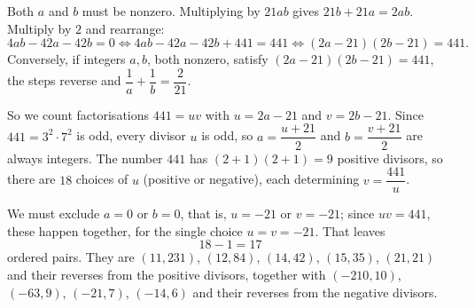 Both $a$ and $b$ must be nonzero. Multiplying by $21ab$ gives $21b+21a=2ab$. Multiply by $2$ and rearrange:
\[4ab-42a-42b=0\iff 4ab-42a-42b+441=441\iff (2a-21)(2b-21)=441 .\]
Conversely, if integers $a,b$, both nonzero, satisfy $(2a-21)(2b-21)=441$, the steps reverse and $\dfrac{1}{a}+\dfrac{1}{b}=\dfrac{2}{21}$.

So we count factorisations $441=uv$ with $u=2a-21$ and $v=2b-21$. Since $441=3^2\cdot7^2$ is odd, every divisor $u$ is odd, so $a=\dfrac{u+21}{2}$ and $b=\dfrac{v+21}{2}$ are always integers. The number $441$ has $(2+1)(2+1)=9$ positive divisors, so there are $18$ choices of $u$ (positive or negative), each determining $v=\dfrac{441}{u}$.

We must exclude $a=0$ or $b=0$, that is, $u=-21$ or $v=-21$; since $uv=441$, these happen together, for the single choice $u=v=-21$. That leaves
\[18-1=\boxed{17}\]
ordered pairs. They are $(11,231)$, $(12,84)$, $(14,42)$, $(15,35)$, $(21,21)$ and their reverses from the positive divisors, together with $(-210,10)$, $(-63,9)$, $(-21,7)$, $(-14,6)$ and their reverses from the negative divisors.
